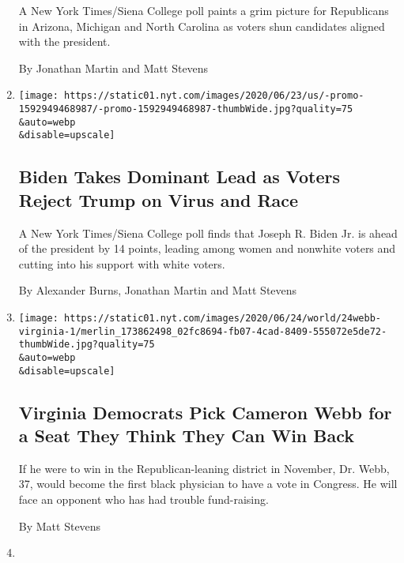 \begin{enumerate}
  A New York Times/Siena College poll paints a grim picture for
  Republicans in Arizona, Michigan and North Carolina as voters shun
  candidates aligned with the president.

  By Jonathan Martin and Matt Stevens
\item
  \href{/2020/06/24/us/politics/trump-biden-poll-nyt-upshot-siena-college.html}{}

  \texttt{[image: https://static01.nyt.com/images/2020/06/23/us/-promo-1592949468987/-promo-1592949468987-thumbWide.jpg?quality=75\\\&auto=webp\\\&disable=upscale]}

  \hypertarget{biden-takes-dominant-lead-as-voters-reject-trump-on-virus-and-race}{%
  \subsection{Biden Takes Dominant Lead as Voters Reject Trump on Virus
  and
  Race}\label{biden-takes-dominant-lead-as-voters-reject-trump-on-virus-and-race}}

  A New York Times/Siena College poll finds that Joseph R. Biden Jr. is
  ahead of the president by 14 points, leading among women and nonwhite
  voters and cutting into his support with white voters.

  By Alexander Burns, Jonathan Martin and Matt Stevens
\item
  \href{/2020/06/24/us/politics/cameron-webb-wins-virginia.html}{}

  \texttt{[image: https://static01.nyt.com/images/2020/06/24/world/24webb-virginia-1/merlin\_173862498\_02fc8694-fb07-4cad-8409-555072e5de72-thumbWide.jpg?quality=75\\\&auto=webp\\\&disable=upscale]}

  \hypertarget{virginia-democrats-pick-cameron-webb-for-a-seat-they-think-they-can-win-back}{%
  \subsection{Virginia Democrats Pick Cameron Webb for a Seat They Think
  They Can Win
  Back}\label{virginia-democrats-pick-cameron-webb-for-a-seat-they-think-they-can-win-back}}

  If he were to win in the Republican-leaning district in November, Dr.
  Webb, 37, would become the first black physician to have a vote in
  Congress. He will face an opponent who has had trouble fund-raising.

  By Matt Stevens
\item
  \href{/2020/06/22/us/politics/trump-vs-biden-presidential-debates.html}{}


\end{enumerate}

